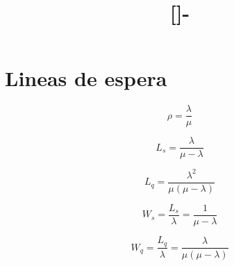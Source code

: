 \documentclass{templateNote}
\newcommand{\newparagraph}{\par\vspace{\baselineskip}\noindent}
\begin{document}

\title{[\asignatura]-\titulo}
\author{
    \autor
}
\portada
\margenes %

\section{Lineas de espera}
\begin{tcolorbox}[
    colframe=black!100, %
    colback=white!100,       %
    coltitle=white!100, %
    title=\textbf{M/M/1}, %
]
    \begin{minipage}{0.1\textwidth}
        \begin{equation*}
            \rho = \frac{\lambda}{\mu}
        \end{equation*}
    \end{minipage}
    \hfill
    \begin{minipage}{0.15\textwidth}
        \begin{equation*}
            L_s = \frac{\lambda}{\mu-\lambda}
        \end{equation*}
    \end{minipage}
    \hfill
    \begin{minipage}{0.2\textwidth}
        \begin{equation*}
            L_q = \frac{\lambda^2}{\mu(\mu-\lambda)}
        \end{equation*}
    \end{minipage}
    \hfill
    \begin{minipage}{0.25\textwidth}
        \begin{equation*}
            W_s = \frac{L_s}{\lambda} = \frac{1}{\mu-\lambda}
        \end{equation*}
    \end{minipage}
    \newparagraph
    \begin{minipage}{0.3\textwidth}
        \begin{equation*}
            W_q = \frac{L_q}{\lambda} = \frac{\lambda}{\mu(\mu-\lambda)}
        \end{equation*}
    \end{minipage}
    \hfill
    \begin{minipage}{0.2\textwidth}

\end{minipage}
\end{tcolorbox}
\end{document}
